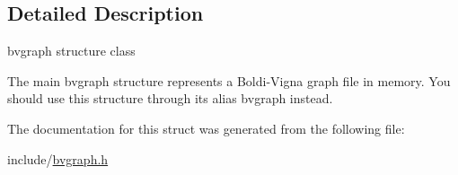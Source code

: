 \subsection{Detailed Description}
bvgraph structure class 

The main bvgraph structure represents a Boldi-\/\+Vigna graph file in memory. You should use this structure through its alias bvgraph instead. 

The documentation for this struct was generated from the following file\+:\begin{DoxyCompactItemize}
\item 
include/\hyperlink{bvgraph_8h}{bvgraph.\+h}\end{DoxyCompactItemize}
